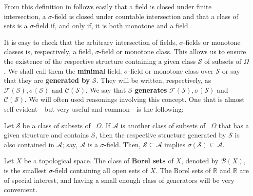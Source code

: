 From this definition in follows easily that a field is closed under finite
intersection, a \(\sigma\)-field is closed under countable intersection and that
a class of sets is a \(\sigma\)-field if, and only if, it is both monotone and a
field.
	
It is easy to check that the arbitrary intersection of fields,
\(\sigma\)-fields or monotone classes is, respectively, a field,
\(\sigma\)-field or monotone class.  This allows us to ensure the existence of the
respective structure containing a given class
\(\mathcal{S}\) of subsets of \(\Omega\). We shall call them the
\textbf{minimal} field, \(\sigma\)-field or monotone class over \(\mathcal{S}\)
or say that they are \textbf{generated by}
\(\mathcal{S}\). They will be written, respectively, as
\(\mathcal{F}(\mathcal{S}), \sigma(\mathcal{S})\) and \(\mathcal{C}(\mathcal{S})\). We
say that \(\mathcal{S}\) \textbf{generates}
\(\mathcal{F}(\mathcal{S}), \sigma(\mathcal{S})\) and \(\mathcal{C}(\mathcal{S})\). We will often used reasonings involving this concept. One that is almost self-evident - but very useful and common - is the following:
\begin{remk}\label{remark:generated structures}
		Let \(\mathcal{S}\) be a class of subsets of ~\(\Omega\). If \(\mathcal{A}\) is another class of subsets of ~\(\Omega\) that has a given structure and contains \(\mathcal{S}\), then the respective structure generated by \(\mathcal{S}\) is also contained in \(\mathcal{A}\); say, \(\mathcal{A}\) is a \(\sigma\)-field. Then, \(\mathcal{S}\subseteq\mathcal{A}\) implies \(\sigma(\mathcal{S})\subseteq\mathcal{A}\).
\end{remk}
	
Let \(X\) be a topological space. The class of \textbf{Borel sets} of \(X\),
denoted by \(\mathscr{B}(X)\), is the smallest \(\sigma\)-field containing all
open sets of \(X\). The Borel sets of \(\mathbb{R}\) and
\(\overline{\mathbb{R}}\) are of special interest, and having a small enough class of generators will be very convenient.
	
